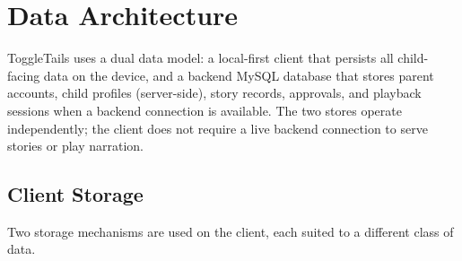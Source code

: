 \section{Data Architecture}

ToggleTails uses a dual data model: a local-first client that persists all child-facing data on the device, and a backend MySQL database that stores parent accounts, child profiles (server-side), story records, approvals, and playback sessions when a backend connection is available. The two stores operate independently; the client does not require a live backend connection to serve stories or play narration.

\subsection*{Client Storage}

Two storage mechanisms are used on the client, each suited to a different class of data.

